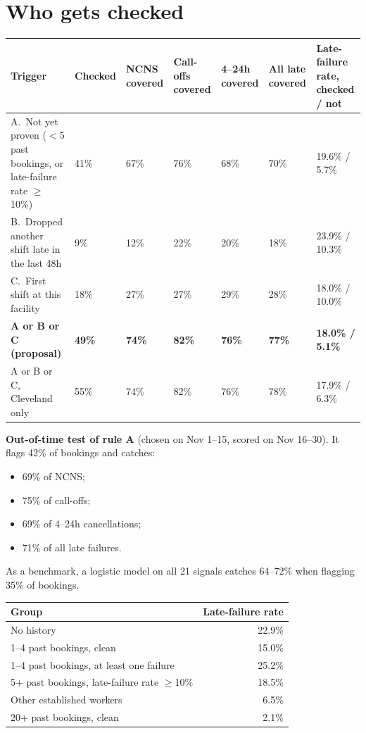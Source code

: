\documentclass[11pt]{article}
\newcommand{\lthan}{\ensuremath{<}}
\begin{document}
\section{Who gets checked}
\begin{center}\small
{}
\begin{tabularx}{\textwidth}{@{}LR{1.1cm}R{1.2cm}R{1.2cm}R{1.2cm}R{1.2cm}R{2.0cm}@{}}
\toprule
Trigger & Checked & NCNS covered & Call-offs covered & 4--24h covered & All late covered & Late-failure rate, checked / not \\
\midrule
A.\ Not yet proven (\lthan{}5 past bookings, or late-failure rate $\ge$10\%) & 41\% & 67\% & 76\% & 68\% & 70\% & 19.6\% / 5.7\% \\
B.\ Dropped another shift late in the last 48h & 9\% & 12\% & 22\% & 20\% & 18\% & 23.9\% / 10.3\% \\
C.\ First shift at this facility & 18\% & 27\% & 27\% & 29\% & 28\% & 18.0\% / 10.0\% \\
\textbf{A or B or C (proposal)} & \textbf{49\%} & \textbf{74\%} & \textbf{82\%} & \textbf{76\%} & \textbf{77\%} &
\textbf{18.0\% / 5.1\%} \\
A or B or C, Cleveland only & 55\% & 74\% & 82\% & 76\% & 78\% & 17.9\% / 6.3\% \\
\bottomrule
\end{tabularx}
\end{center}

\textbf{Out-of-time test of rule A} (chosen on Nov 1--15, scored on Nov 16--30). It flags 42\% of bookings and catches:
\begin{itemize}
  \item 69\% of NCNS;
  \item 75\% of call-offs;
  \item 69\% of 4--24h cancellations;
  \item 71\% of all late failures.
\end{itemize}
As a benchmark, a logistic model on all 21 signals catches 64--72\% when flagging 35\% of bookings.

\begin{center}\small
{}
\begin{tabular}{@{}lr@{}}
\toprule
Group & Late-failure rate \\
\midrule
No history & 22.9\% \\
1--4 past bookings, clean & 15.0\% \\
1--4 past bookings, at least one failure & 25.2\% \\
5+ past bookings, late-failure rate $\ge$10\% & 18.5\% \\
Other established workers & 6.5\% \\
20+ past bookings, clean & 2.1\% \\
\bottomrule
\end{tabular}
\end{center}
\end{document}
